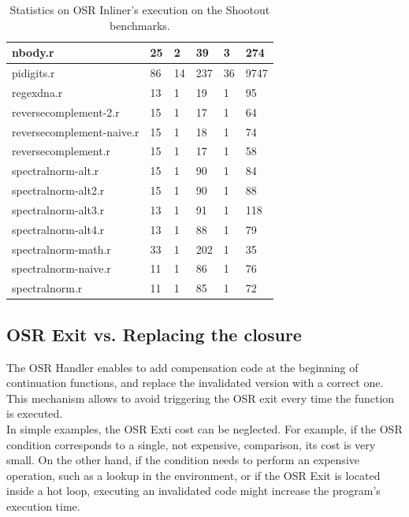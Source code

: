 \begin{table}[h!]
{\begin{tabular}{|l|l|l|l|l|l|}
nbody.r & 25 & 2 & 39 & 3 & 274\\ \hline
pidigits.r & 86 & 14 & 237 & 36 & 9747\\ \hline
regexdna.r & 13 & 1 & 19 & 1 & 95\\ \hline
reversecomplement-2.r & 15 & 1 & 17 & 1 & 64\\ \hline
reversecomplement-naive.r & 15 & 1 & 18 & 1 & 74\\ \hline
reversecomplement.r & 15 & 1 & 17 & 1 & 58\\ \hline
spectralnorm-alt.r & 15 & 1 & 90 & 1 & 84\\ \hline
spectralnorm-alt2.r & 15 & 1 & 90 & 1 & 88\\ \hline
spectralnorm-alt3.r & 13 & 1 & 91 & 1 & 118\\ \hline
spectralnorm-alt4.r & 13 & 1 & 88 & 1 & 79\\ \hline
spectralnorm-math.r & 33 & 1 & 202 & 1 & 35\\ \hline
spectralnorm-naive.r & 11 & 1 & 86 & 1 & 76\\ \hline
spectralnorm.r & 11 & 1 & 85 & 1 & 72\\ \hline

\end{tabular}}%
\caption{Statistics on OSR Inliner's execution on the Shootout benchmarks.}
\label{tab:statsinliner}
\end{table}
\clearpage



\subsection{OSR Exit vs. Replacing the closure}
The OSR Handler enables to add compensation code at the beginning of continuation functions, and replace the invalidated version with a correct one.
This mechanism allows to avoid triggering the OSR exit every time the function is executed.\\

In simple examples, the OSR Exti cost can be neglected.
For example, if the OSR condition corresponds to a single, not expensive, comparison, its cost is very small.
On the other hand, if the condition needs to perform an expensive operation, such as a lookup in the environment, or if the OSR Exit is located inside a hot loop, executing an invalidated code might increase the program's execution time.\\


